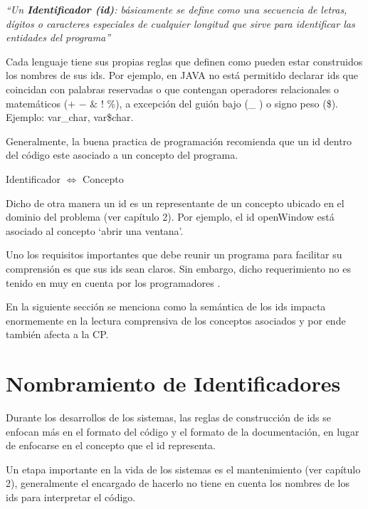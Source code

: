\documentclass[a4paper,12pt]{report}
\begin{document}
\textit{“Un \textbf{Identificador (id)}: básicamente se define como una secuencia de letras, dígitos o caracteres especiales de cualquier longitud que sirve para identificar las entidades del programa”}
 
Cada lenguaje tiene sus propias reglas que definen como pueden estar construidos los nombres de sus ids. Por ejemplo, en JAVA no está permitido declarar ids que coincidan con palabras reservadas o que contengan operadores relacionales o matemáticos ($+$ $-$ $\&$ $!$ $\%$), a excepción del guión bajo (\_ ) o signo peso (\$). Ejemplo: \textsf{var\_char, var\$char}.

Generalmente, la buena practica de programación recomienda que un id dentro del código este asociado a un concepto del programa. 

\begin{center}
\textsf{Identificador $\Leftrightarrow$ Concepto}
\end{center}

Dicho de otra manera un id es un representante de un concepto ubicado en el dominio del problema \cite{DFPM05,DMDJ13} (ver capítulo 2). Por ejemplo, el id \textsf{openWindow} está asociado al concepto `abrir una ventana'.


Uno los requisitos importantes que debe reunir un programa para facilitar su comprensión es que sus ids sean claros. Sin embargo, dicho requerimiento no es tenido en muy en cuenta por los programadores \cite{DFPM05,DLHD06,DCHD06}.

En la siguiente sección se menciona como la semántica de los ids impacta enormemente en la lectura comprensiva de los conceptos asociados y por ende también afecta a la CP.

\pagebreak
\section{Nombramiento de Identificadores}

Durante los desarrollos de los sistemas, las reglas de construcción de ids se enfocan más en el formato del código y el formato de la documentación, en lugar de enfocarse en el concepto que el id representa. 

Un etapa importante en la vida de los sistemas es el mantenimiento (ver capítulo 2), generalmente el encargado de hacerlo no tiene en cuenta los nombres de los ids para interpretar el código.
\end{document}
